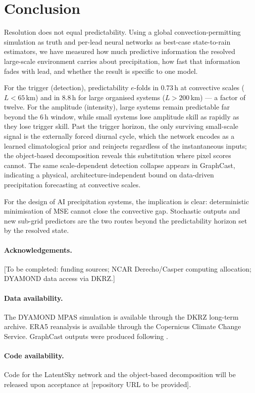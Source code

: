 \documentclass[11pt]{article}
\begin{document}
\section{Conclusion}
\label{sec:conclusion}

Resolution does not equal predictability.
Using a global convection-permitting simulation as truth and per-lead neural
networks as best-case state-to-rain estimators, we have measured how much
predictive information the resolved large-scale environment carries about
precipitation, how fast that information fades with lead, and whether the
result is specific to one model.

For the trigger (detection), predictability $e$-folds in $0.73$\,h at
convective scales ($L<65$\,km) and in $8.8$\,h for large organised systems
($L>200$\,km) --- a factor of twelve.
For the amplitude (intensity), large systems remain predictable far beyond the
$6$\,h window, while small systems lose amplitude skill as rapidly as they lose
trigger skill.
Past the trigger horizon, the only surviving small-scale signal is the
externally forced diurnal cycle, which the network encodes as a learned
climatological prior and reinjects regardless of the instantaneous inputs;
the object-based decomposition reveals this substitution where pixel scores
cannot.
The same scale-dependent detection collapse appears in GraphCast, indicating a
physical, architecture-independent bound on data-driven precipitation
forecasting at convective scales.

For the design of AI precipitation systems, the implication is clear:
deterministic minimisation of MSE cannot close the convective gap.
Stochastic outputs and new sub-grid predictors are the two routes beyond the
predictability horizon set by the resolved state.

\paragraph{Acknowledgements.}
[To be completed: funding sources; NCAR Derecho/Casper computing allocation;
DYAMOND data access via DKRZ.]

\paragraph{Data availability.}
The DYAMOND MPAS simulation is available through the DKRZ long-term archive.
ERA5 reanalysis is available through the Copernicus Climate Change Service.
GraphCast outputs were produced following \citet{lam2023graphcast}.

\paragraph{Code availability.}
Code for the LatentSky network and the object-based decomposition will be
released upon acceptance at [repository URL to be provided].

\printbibliography
\end{document}
